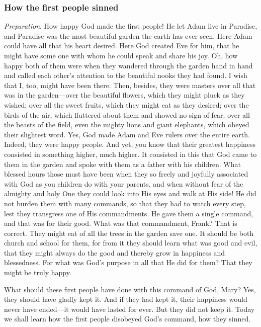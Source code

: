 \subsubsection{How the first people sinned}

\emph{Preparation}. How happy God made the first people! He let Adam live in Paradise, and Paradise was the most beautiful garden the earth has ever seen. Here Adam could have all that his heart
desired. Here God created Eve for him, that he might have some one with whom he could speak and share his joy. Oh, how happy both of them were when they wandered through the garden hand in hand and called each other’s attention to the beautiful nooks they had found. I wish that I, too, might have been there. Then, besides, they were masters over all that was in the garden—over the beautiful flowers, which they might pluck as they wished; over all the sweet fruits, which they might eat as they desired; over the birds of the air, which fluttered about them and showed no sign of fear; over all the beasts of the field, even the mighty lions and giant elephants, which obeyed their slightest word. Yes, God made Adam and Eve rulers over the entire earth. Indeed, they were happy people. And yet, you know that their greatest happiness consisted in something higher, much higher. It consisted in this that God came to them in the garden and spoke with them as a father with his children. What blessed hours those must have been when they so freely and joyfully associated with God as you children do with your parents, and when without fear of the almighty and holy One they could look into His eyes and walk at His side! He did not burden them with many commands, so that they had to watch every step, lest they transgress one of His commandments. He gave them a single command, and that was for their good. What was that commandment, Frank? That is correct. They might eat of all the trees in the garden save one. It should be both church and school for them, for from it they should learn what was good and evil, that they might always do the good and thereby grow in happiness and blessedness. For what was God’s purpose in all that He did for them? That they might be truly happy.

What should these first people have done with this command of God, Mary? Yes, they should have gladly kept it. And if they had kept it, their happiness would never have ended—it would have lasted for ever. But they did not keep it. Today we shall learn how the first people disobeyed God’s command, how they sinned.

